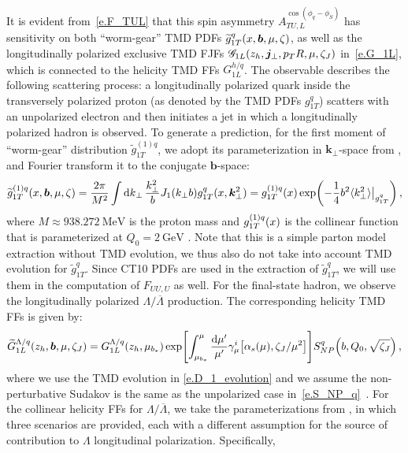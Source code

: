 \documentclass[a4paper, 11 pt]{article}
\begin{document}
It is evident from~\cref{e.F_TUL} that this spin asymmetry $A_{TU,L}^{\cos(\phi _q - \phi _{S})}$ has sensitivity on both ``worm-gear'' TMD PDFs $\widetilde{g}_{1T}^{q} \pqty{x, \boldsymbol{b}, \mu, \zeta}$, as well as the longitudinally polarized exclusive TMD FJFs $\mathscr{G}_{1L} \pqty{z_h, \boldsymbol{j}_{\perp}, p_T R,  \mu, \zeta_J}$ in~\cref{e.G_1L}, which is connected to the helicity TMD FFs $G_{1L}^{h/q}$. The observable describes the following scattering process: a longitudinally polarized quark inside the transversely polarized proton (as denoted by the TMD PDFs $g_{1T}^q$) scatters with an unpolarized electron and then initiates a jet in which a longitudinally polarized hadron is observed.
To generate a prediction, for the first moment of ``worm-gear'' distribution $\widetilde{g}_{1T}^{(1)q}$, we adopt its parameterization in $\boldsymbol{k}_{\perp}$-space from \cite{Bhattacharya:2021twu}, and Fourier transform it to the conjugate $\boldsymbol{b}$-space:
\begin{equation}
\widetilde{g}_{1T}^{(1)q} \pqty{x, \boldsymbol{b}, \mu, \zeta}
=
\frac{2\pi}{M^2} \int \dd{k}_{\perp}\frac{{k}_{\perp}^2}{b}J_1({k}_{\perp}b) g_{1T}^{q} (x, \boldsymbol{k}_{\perp}^2)
= g_{1T}^{\pqty{1} q} \pqty{x}
\exp(-\frac{1}{4} b^2 \langle k_{\perp}^2\rangle \big|_{g_{1T}^q})
\, ,
\end{equation}
where $M \approx 938.272~\mathrm{MeV}$ is the proton mass and $g_{1T}^{\pqty{1}q} \pqty{x}$ is the collinear function that is parameterized at $Q_0 = 2~\mathrm{GeV}$ \cite{Bhattacharya:2021twu}. Note that this is a simple parton model extraction without TMD evolution, we thus also do not take into account TMD evolution for $\widetilde{g}_{1T}^{q}$. Since CT10 PDFs \cite{Lai:2010vv} are used in the extraction of $\widetilde{g}_{1T}^{q}$, we will use them in the computation of $F_{UU, U}$ as well. For the final-state hadron, we observe the longitudinally polarized $\Lambda/\overline{\Lambda}$ production. The corresponding helicity TMD FFs is given by:
\begin{align}
\widetilde{G}_{1L}^{\Lambda/q} \pqty{z_h, \boldsymbol{b}, \mu, \zeta_J}
=
{G}_{1L}^{\Lambda/q} \pqty{z_h, \mu_{b_{*}}} 
\exp[\int_{\mu_{b_*}}^\mu \frac{\dd{\mu'}}{\mu'} \gamma_\mu^i \bqty{\alpha_s(\mu), \zeta_J/\mu^2}]
S_{NP}^q \pqty{b, Q_0, \sqrt{\zeta_J}}
\, ,
\end{align}
where we use the TMD evolution in \cref{e.D_1_evolution} and we assume the non-perturbative Sudakov is the same as the unpolarized case in~\cref{e.S_NP_q}~\cite{Koike:2006fn}. For the collinear helicity FFs for $\Lambda/\overline{\Lambda}$, we take the parameterizations from \cite{deFlorian:1997zj}, in which three scenarios are provided, each with a different assumption for the source of contribution to $\Lambda$ longitudinal polarization. Specifically,
\end{document}
